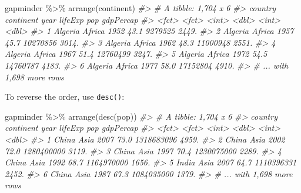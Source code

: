 \documentclass[
]{book}
\newenvironment{Shaded}{\begin{snugshade}}{\end{snugshade}}
\newcommand{\CommentTok}[1]{\textcolor[rgb]{0.56,0.35,0.01}{\textit{#1}}}
\newcommand{\FunctionTok}[1]{\textcolor[rgb]{0.00,0.00,0.00}{#1}}
\newcommand{\NormalTok}[1]{#1}
\newcommand{\SpecialCharTok}[1]{\textcolor[rgb]{0.00,0.00,0.00}{#1}}
\begin{document}
\begin{Shaded}
\begin{Highlighting}[]
\NormalTok{gapminder }\SpecialCharTok{\%\textgreater{}\%} \FunctionTok{arrange}\NormalTok{(continent)}
\CommentTok{\#\textgreater{} \# A tibble: 1,704 x 6}
\CommentTok{\#\textgreater{}   country continent  year lifeExp      pop gdpPercap}
\CommentTok{\#\textgreater{}   \textless{}fct\textgreater{}   \textless{}fct\textgreater{}     \textless{}int\textgreater{}   \textless{}dbl\textgreater{}    \textless{}int\textgreater{}     \textless{}dbl\textgreater{}}
\CommentTok{\#\textgreater{} 1 Algeria Africa     1952    43.1  9279525     2449.}
\CommentTok{\#\textgreater{} 2 Algeria Africa     1957    45.7 10270856     3014.}
\CommentTok{\#\textgreater{} 3 Algeria Africa     1962    48.3 11000948     2551.}
\CommentTok{\#\textgreater{} 4 Algeria Africa     1967    51.4 12760499     3247.}
\CommentTok{\#\textgreater{} 5 Algeria Africa     1972    54.5 14760787     4183.}
\CommentTok{\#\textgreater{} 6 Algeria Africa     1977    58.0 17152804     4910.}
\CommentTok{\#\textgreater{} \# ... with 1,698 more rows}
\end{Highlighting}
\end{Shaded}

To reverse the order, use \texttt{desc()}:

\begin{Shaded}
\begin{Highlighting}[]
\NormalTok{gapminder }\SpecialCharTok{\%\textgreater{}\%} \FunctionTok{arrange}\NormalTok{(}\FunctionTok{desc}\NormalTok{(pop))}
\CommentTok{\#\textgreater{} \# A tibble: 1,704 x 6}
\CommentTok{\#\textgreater{}   country continent  year lifeExp        pop gdpPercap}
\CommentTok{\#\textgreater{}   \textless{}fct\textgreater{}   \textless{}fct\textgreater{}     \textless{}int\textgreater{}   \textless{}dbl\textgreater{}      \textless{}int\textgreater{}     \textless{}dbl\textgreater{}}
\CommentTok{\#\textgreater{} 1 China   Asia       2007    73.0 1318683096     4959.}
\CommentTok{\#\textgreater{} 2 China   Asia       2002    72.0 1280400000     3119.}
\CommentTok{\#\textgreater{} 3 China   Asia       1997    70.4 1230075000     2289.}
\CommentTok{\#\textgreater{} 4 China   Asia       1992    68.7 1164970000     1656.}
\CommentTok{\#\textgreater{} 5 India   Asia       2007    64.7 1110396331     2452.}
\CommentTok{\#\textgreater{} 6 China   Asia       1987    67.3 1084035000     1379.}
\CommentTok{\#\textgreater{} \# ... with 1,698 more rows}
\end{Highlighting}
\end{Shaded}
\end{document}
